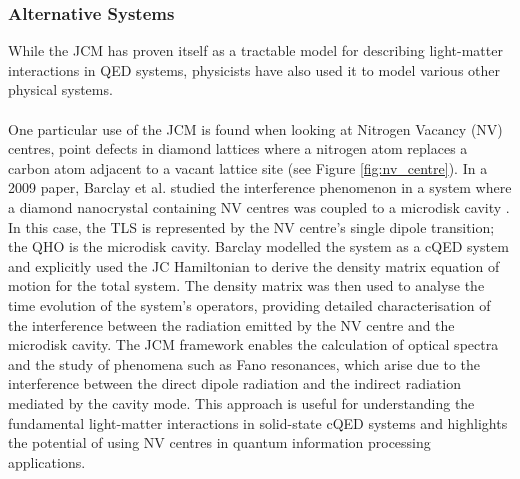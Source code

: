 \documentclass[12pt,a4paper]{article}
\begin{document}
\subsubsection{Alternative Systems}

While the JCM has proven itself as a tractable model for describing light-matter interactions in QED systems, physicists have also used it to model various other physical systems.\\
\\
One particular use of the JCM is found when looking at Nitrogen Vacancy (NV) centres, point defects in diamond lattices where a nitrogen atom replaces a carbon atom adjacent to a vacant lattice site (see Figure \ref{fig:nv_centre})\cite{General2024-JC_overview}. In a 2009 paper, Barclay et al. studied the interference phenomenon in a system where a diamond nanocrystal containing NV centres was coupled to a microdisk cavity \cite{Context2009-Alt_NVcentres}. In this case, the TLS is represented by the NV centre's single dipole transition; the QHO is the microdisk cavity. Barclay modelled the system as a cQED system and explicitly used the JC Hamiltonian to derive the density matrix equation of motion for the total system. The density matrix was then used to analyse the time evolution of the system's operators, providing detailed characterisation of the interference between the radiation emitted by the NV centre and the microdisk cavity. The JCM framework enables the calculation of optical spectra and the study of phenomena such as Fano resonances, which arise due to the interference between the direct dipole radiation and the indirect radiation mediated by the cavity mode. This approach is useful for understanding the fundamental light-matter interactions in solid-state cQED systems and highlights the potential of using NV centres in quantum information processing applications. 
\end{document}
